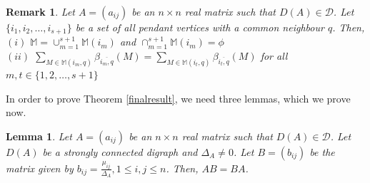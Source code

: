 \documentclass[notitlepage,12pt,reqno]{amsart}
\newtheorem{lem}[thm]{Lemma}
\newtheorem{rem}[thm]{Remark}
\numberwithin{equation}{section}
\begin{document}
\begin{rem}\label{twoproperties}
Let $A=(a_{ij})$ be an $n\times n$ real matrix such that $D(A)\in \mathcal{D}$. Let $\{i_1,i_2,\ldots ,i_{s+1}\}$ be a set of all pendant vertices with a common neighbour $q$. Then,\\
\rm{$(i)$} $\mathbb{M}=\cup _{m=1}^{s+1}\mathbb{M}(i_m)$ and $\cap _{m=1}^{s+1}\mathbb{M}(i_m)=\phi $\\
\rm{$(ii)$} $\sum _{M\in \mathbb{M}(i_m,q)}\beta _{\overline{i_m,q}}(M)=\sum _{M\in \mathbb{M}(i_t,q)}\beta _{\overline{i_t,q}}(M)$ for all $m,t\in \{1,2,\ldots ,s+1\}$
\end{rem}

In order to prove Theorem \ref{finalresult}, we need three lemmas, which we prove now.

\begin{lem}\label{1}
Let $A=(a_{ij})$ be an $n\times n$ real matrix such that $D(A)\in \mathcal{D}$. Let $D(A)$ be a strongly connected digraph and $\Delta _A \neq 0$. Let $B=(b_{ij})$ be the matrix given by $b_{ij}=\frac{\mu _{ij}}{\Delta _A}, 1\leq i,j\leq n$. Then, $AB=BA$.
\end{lem}
\end{document}

